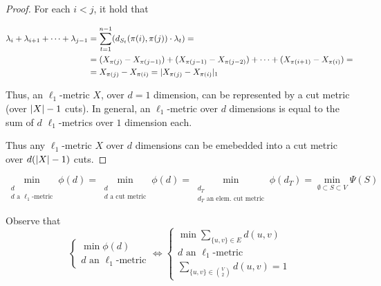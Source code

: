 \begin{proof}
        For each $i < j$, it hold that

        \begin{equation*}
            \begin{split}
                \lambda_i  + \lambda_{i+1} + \cdots + \lambda_{j-1} &= \sum_{t=1}^{n-1}(d_{S_t}(\pi(i), \pi(j)) \cdot \lambda_t) =\\
                    &= (X_{\pi(j)} - X_{\pi(j-1)}) + (X_{\pi(j-1)} - X_{\pi(j-2)}) + \cdots + (X_{\pi(i+1)} - X_{\pi(i)}) =\\
                    &= X_{\pi(j)} - X_{\pi(i)} = \vert X_{\pi(j)} - X_{\pi(i)} \vert_1
            \end{split}
        \end{equation*}

        Thus, an $\ell_1$-metric $X$, over $d=1$ dimension, can be represented by a cut metric (over $\vert X \vert-1$ cuts).
        In general, an $\ell_1$-metric over $d$ dimensions is equal to the sum of $d$ $\ell_1$-metrics over $1$ dimension each.

        Thus any $\ell_1$-metric $X$ over $d$ dimensions can be emebedded into a cut metric over $d(\vert X \vert-1)$ cuts.
    \end{proof}

    \begin{corollary}
        \[ \min_{\substack{d\\ d \text{ a } \ell_1 \text{-metric}}} \phi(d) = \min_{\substack{d\\ d \text{  a cut metric}}} \phi(d) = \min_{\substack{d_T\\ d_T \text{ an elem. cut metric}}} \phi(d_T) = \min_{\emptyset \subset S \subset V} \Psi(S)  \]
    \end{corollary}

    Observe that
    \begin{equation}
        \begin{cases}
            \min \phi(d)\\
            d \text{ an } \ell_1 \text{-metric}
        \end{cases}
        \Longleftrightarrow
        \begin{cases}
            \min \sum_{\{u,v\} \in E} d(u,v)\\
            d \text{ an } \ell_1 \text{-metric}\\
            \sum_{\{u,v\} \in \binom{V}{2}} d(u,v) = 1
        \end{cases}
    \end{equation}

